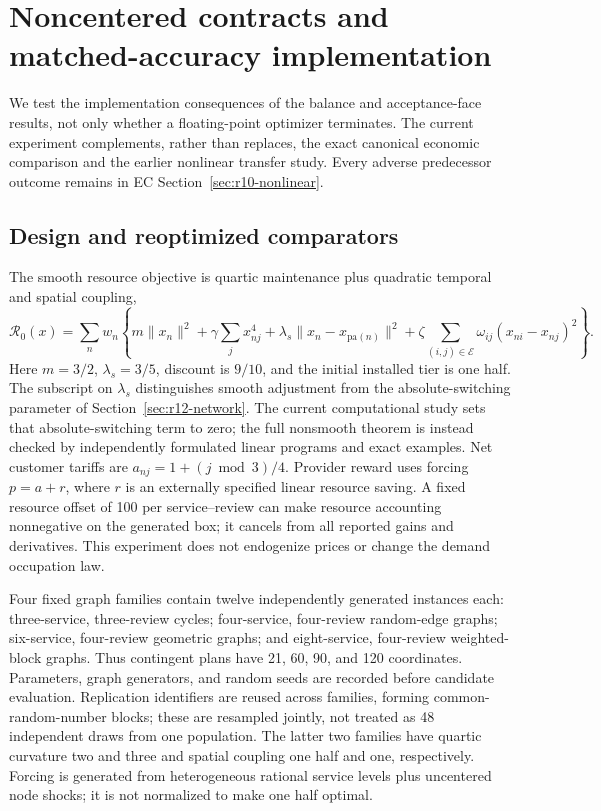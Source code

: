 \section{Noncentered contracts and matched-accuracy implementation}\label{sec:r12-experiment}
We test the implementation consequences of the balance and acceptance-face results, not only whether a floating-point optimizer terminates. The current experiment complements, rather than replaces, the exact canonical economic comparison and the earlier nonlinear transfer study. Every adverse predecessor outcome remains in EC Section~\ref{sec:r10-nonlinear}.

\subsection{Design and reoptimized comparators}
The smooth resource objective is quartic maintenance plus quadratic temporal and spatial coupling,
\[
 \mathcal R_0(x)=\sum_n w_n\left\{m\|x_n\|^2+\gamma\sum_jx_{nj}^4
               +\lambda_s\|x_n-x_{\mathrm{pa}(n)}\|^2
               +\zeta\sum_{(i,j)\in\mathcal E}\omega_{ij}(x_{ni}-x_{nj})^2\right\}.
\]
Here $m=3/2$, $\lambda_s=3/5$, discount is $9/10$, and the initial installed tier is one half. The subscript on $\lambda_s$ distinguishes smooth adjustment from the absolute-switching parameter of Section~\ref{sec:r12-network}. The current computational study sets that absolute-switching term to zero; the full nonsmooth theorem is instead checked by independently formulated linear programs and exact examples. Net customer tariffs are $a_{nj}=1+(j\bmod3)/4$. Provider reward uses forcing $p=a+r$, where $r$ is an externally specified linear resource saving. A fixed resource offset of 100 per service--review can make resource accounting nonnegative on the generated box; it cancels from all reported gains and derivatives. This experiment does not endogenize prices or change the demand occupation law.

Four fixed graph families contain twelve independently generated instances each: three-service, three-review cycles; four-service, four-review random-edge graphs; six-service, four-review geometric graphs; and eight-service, four-review weighted-block graphs. Thus contingent plans have 21, 60, 90, and 120 coordinates. Parameters, graph generators, and random seeds are recorded before candidate evaluation. Replication identifiers are reused across families, forming common-random-number blocks; these are resampled jointly, not treated as 48 independent draws from one population. The latter two families have quartic curvature two and three and spatial coupling one half and one, respectively. Forcing is generated from heterogeneous rational service levels plus uncentered node shocks; it is not normalized to make one half optimal.

